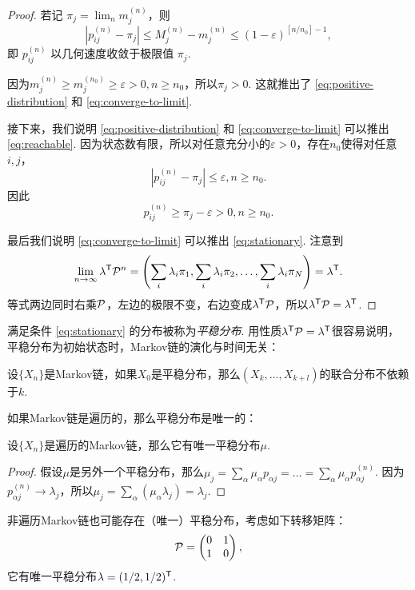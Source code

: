 \begin{proof}
若记 $\pi_j = \lim _n m_j^{(n)}$，则
\[
\left|p_{i j}^{(n)} - \pi_j\right| \leq M_j^{(n)} - m_j^{(n)} \leq (1-\varepsilon)^{\left[n / n_0\right] - 1},
\]
即 $p_{i j}^{(n)}$ 以几何速度收敛于极限值 $\pi_j$. 

因为$m_j^{(n)} \geqslant m_j^{\left(n_0\right)} \geqslant \varepsilon > 0, n \geqslant n_0$，所以$\pi_j > 0$. 这就推出了 \eqref{eq:positive-distribution} 和 \eqref{eq:converge-to-limit}. 

接下来，我们说明 \eqref{eq:positive-distribution} 和 \eqref{eq:converge-to-limit} 可以推出 \eqref{eq:reachable}.  因为状态数有限，所以对任意充分小的$\varepsilon > 0$，存在$n_0$使得对任意$i,j$，
\[
\left|p_{i j}^{(n)} - \pi_j\right| \leq \varepsilon, n \geq n_0.
\]
因此
\[
p_{i j}^{(n)} \geq \pi_j - \varepsilon > 0, n \geq n_0.
\]

最后我们说明 \eqref{eq:converge-to-limit} 可以推出 \eqref{eq:stationary}. 注意到
\[
\lim_{n \to \infty} \lambda^{\mathsf{T}} \mathcal P^n = \left(\sum_i \lambda_i \pi_1, \sum_i \lambda_i \pi_2, \ldots, \sum_i \lambda_i \pi_N\right)=\lambda^{\mathsf{T}}.
\]
等式两边同时右乘$\mathcal P$，左边的极限不变，右边变成$\lambda^{\mathsf{T}} \mathcal P$，所以$\lambda^{\mathsf{T}} \mathcal P = \lambda^{\mathsf{T}}$.
\end{proof}

满足条件 \eqref{eq:stationary} 的分布被称为\emph{平稳分布}. 用性质$\lambda^{\mathsf{T}} \mathcal P = \lambda^{\mathsf{T}}$很容易说明，平稳分布为初始状态时，Markov链的演化与时间无关：
\begin{proposition}\label{prop:stationary-distribution}
设$\{X_n\}$是Markov链，如果$X_0$是平稳分布，那么$(X_k,\dots,X_{k+l})$的联合分布不依赖于$k$.
\end{proposition}

如果Markov链是遍历的，那么平稳分布是唯一的：
\begin{proposition}\label{prop:unique-stationary-distribution}
设$\{X_n\}$是遍历的Markov链，那么它有唯一平稳分布$\mu$. 
\end{proposition}
    \begin{proof}
        假设$\mu$是另外一个平稳分布，那么$\mu_j=\sum_\alpha\mu_\alpha p_{\alpha j}=\dots=\sum_{\alpha}\mu_\alpha p_{\alpha j}^{(n)}$. 因为$p_{\alpha j}^{(n)}\to \lambda_j$，所以$\mu_j=\sum_{\alpha} (\mu_\alpha\lambda_j)=\lambda_j$.
    \end{proof}

非遍历Markov链也可能存在（唯一）平稳分布，考虑如下转移矩阵：
\[\mathcal P=\begin{pmatrix}0&1\\1&0\end{pmatrix},\]
它有唯一平稳分布$\lambda=(1/2,1/2)^{\mathsf{T}}$.


